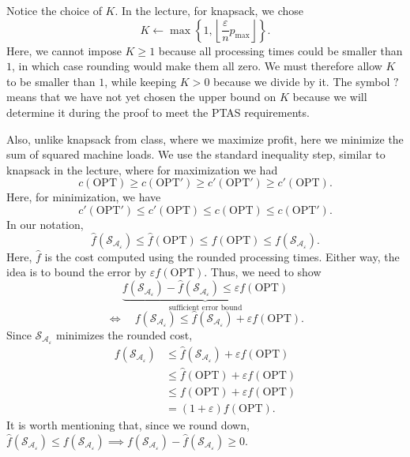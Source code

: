 \documentclass[12pt,a4paper]{article}
\begin{document}
Notice the choice of $K$. In the lecture, for knapsack, we chose
\[
K\gets\max\left\{1,\left\lfloor\frac{\varepsilon}{n}p_{\max}\right\rfloor\right\}.
\]
Here, we cannot impose $K\geq1$ because all processing times could be smaller
than $1$, in which case rounding would make them all zero. We must
therefore allow $K$ to be smaller than $1$, while keeping $K>0$ because
we divide by it. The symbol $?$ means that we have not yet chosen the
upper bound on $K$ because we will determine it during the proof to meet
the PTAS requirements.

Also, unlike knapsack from class, where we maximize profit, here we minimize
the sum of squared machine loads. We use the standard inequality step,
similar to knapsack in the lecture, where for maximization we had
\[
c(\mathrm{OPT})\geq c(\mathrm{OPT}')
\geq c'(\mathrm{OPT}')\geq c'(\mathrm{OPT}).
\]
Here, for minimization, we have
\[
c'(\mathrm{OPT}')\leq c'(\mathrm{OPT})
\leq c(\mathrm{OPT})\leq c(\mathrm{OPT}').
\]
In our notation,
\[
\widehat{f}(\mathcal{S}_{\mathcal{A}_{\varepsilon}})
\leq\widehat{f}(\mathrm{OPT})
\leq f(\mathrm{OPT})
\leq f(\mathcal{S}_{\mathcal{A}_{\varepsilon}}).
\]
Here, $\widehat{f}$ is the cost computed using the rounded processing times.
Either way, the idea is to bound the error by $\varepsilon f(\mathrm{OPT})$.
Thus, we need to show
\begin{equation}
\label{eq:scheduling-sufficient-error}
\underbrace{
f(\mathcal{S}_{\mathcal{A}_{\varepsilon}})
-\widehat{f}(\mathcal{S}_{\mathcal{A}_{\varepsilon}})
\leq\varepsilon f(\mathrm{OPT})
}_{\text{sufficient error bound}}
\end{equation}
\[
\iff\quad
f(\mathcal{S}_{\mathcal{A}_{\varepsilon}})
\leq\widehat{f}(\mathcal{S}_{\mathcal{A}_{\varepsilon}})
+\varepsilon f(\mathrm{OPT}).
\]
Since $\mathcal{S}_{\mathcal{A}_{\varepsilon}}$ minimizes the rounded cost,
\[
\begin{aligned}
f(\mathcal{S}_{\mathcal{A}_{\varepsilon}})
&\leq\widehat{f}(\mathcal{S}_{\mathcal{A}_{\varepsilon}})
+\varepsilon f(\mathrm{OPT})\\
&\leq\widehat{f}(\mathrm{OPT})+\varepsilon f(\mathrm{OPT})\\
&\leq f(\mathrm{OPT})+\varepsilon f(\mathrm{OPT})\\
&=(1+\varepsilon)f(\mathrm{OPT}).
\end{aligned}
\]
It is worth mentioning that, since we round down,
$\widehat{f}(\mathcal{S}_{\mathcal{A}_{\varepsilon}})
\leq f(\mathcal{S}_{\mathcal{A}_{\varepsilon}})
\implies
f(\mathcal{S}_{\mathcal{A}_{\varepsilon}})
-\widehat{f}(\mathcal{S}_{\mathcal{A}_{\varepsilon}})\geq0$.
\end{document}
